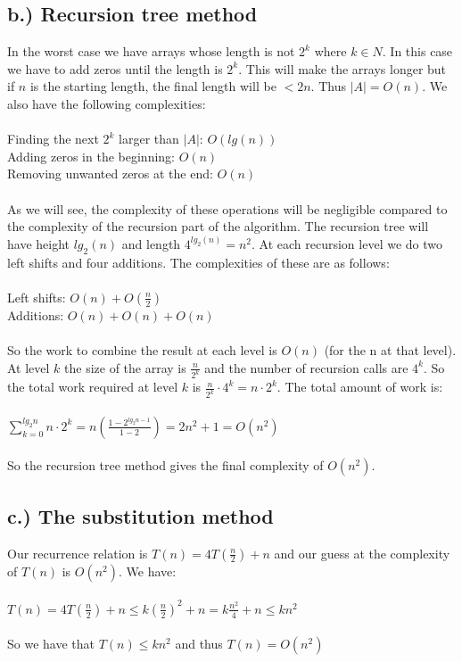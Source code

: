\documentclass{article}
\begin{document}
\subsection*{b.) Recursion tree method}
In the worst case we have arrays whose length is not $2^k$ where $k\in N$. In this case we have to add zeros until the length is $2^k$. This will make the arrays longer but if $n$ is the starting length, the final length will be $< 2n$. Thus $\vert A \vert = O(n)$. We also have the following complexities:\\
\\
Finding the next $2^k$ larger than $\vert A \vert$: $O(lg(n))$ \\
Adding zeros in the beginning: $O(n)$ \\
Removing unwanted zeros at the end: $O(n)$ \\
\\
As we will see, the complexity of these operations will be negligible compared to the complexity of the recursion part of the algorithm. The recursion tree will have height $lg_2(n)$ and length $4^{lg_2(n)} = n^2$. At each recursion level we do two left shifts and four additions. The complexities of these are as follows: \\
\\
Left shifts: $O(n) + O(\frac{n}{2})$ \\
Additions: $O(n) + O(n) + O(n)$\\
\\
So the work to combine the result at each level is $O(n)$ (for the n at that level). At level $k$ the size of the array is $\frac{n}{2^k}$ and the number of recursion calls are $4^k$. So the total work required at level $k$ is $\frac{n}{2^k}\cdot4^k = n\cdot 2^k$. The total amount of work is: \\
\\
$\sum_{k=0}^{lg_2n} n \cdot 2^k = n(\frac{1-2^{lg_2n-1}}{1-2}) = 2n^2 + 1 = O(n^2)$ \\
\\
So the recursion tree method gives the final complexity of $O(n^2)$. 
\subsection*{c.) The substitution method}
Our recurrence relation is $T(n) = 4T(\frac{n}{2}) + n$ and our guess at the complexity of $T(n)$ is $O(n^2)$. We have: \\
\\
$T(n) = 4T(\frac{n}{2}) + n \leq k(\frac{n}{2})^2 + n = k\frac{n^2}{4} + n \leq kn^2$ \\
\\
So we have that $T(n) \leq kn^2$ and thus $T(n) = O(n^2)$
\end{document}
